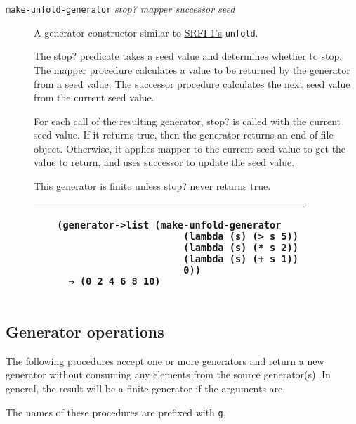 \begin{description}
\item[\texttt{make-unfold-generator} \emph{stop? mapper successor seed}]
A generator constructor similar to
\href{http://srfi.schemers.org/srfi-1/srfi-1.html}{SRFI 1's}
\texttt{unfold}.

The stop? predicate takes a seed value and determines whether to stop.
The mapper procedure calculates a value to be returned by the generator
from a seed value. The successor procedure calculates the next seed
value from the current seed value.

For each call of the resulting generator, stop? is called with the
current seed value. If it returns true, then the generator returns an
end-of-file object. Otherwise, it applies mapper to the current seed
value to get the value to return, and uses successor to update the seed
value.

This generator is finite unless stop? never returns true.

\begin{longtable}[]{@{}ll@{}}
\toprule
\begin{minipage}[t]{0.47\columnwidth}\raggedright\strut
~\strut
\end{minipage} & \begin{minipage}[t]{0.47\columnwidth}\raggedright\strut
\begin{verbatim}
(generator->list (make-unfold-generator
                      (lambda (s) (> s 5))
                      (lambda (s) (* s 2))
                      (lambda (s) (+ s 1))
                      0))
  ⇒ (0 2 4 6 8 10)
\end{verbatim}
\strut
\end{minipage}\tabularnewline
\bottomrule
\end{longtable}
\end{description}

\subsection{Generator operations}\label{generator-operations}

The following procedures accept one or more generators and return a new
generator without consuming any elements from the source generator(s).
In general, the result will be a finite generator if the arguments are.

The names of these procedures are prefixed with \texttt{g}.

